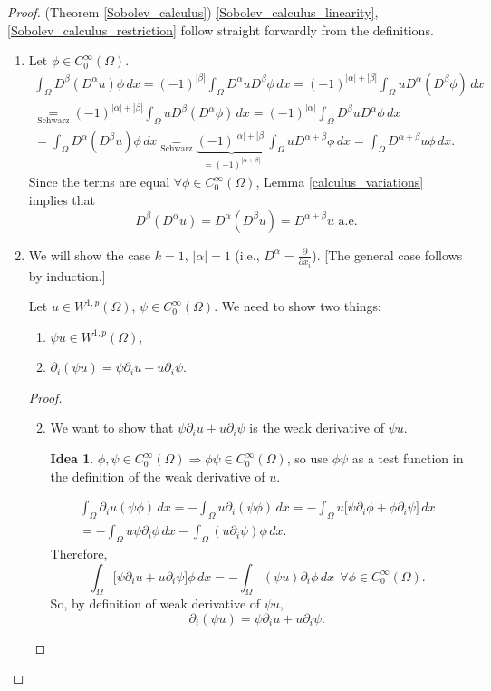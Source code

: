 \documentclass[12pt]{article}
\theoremstyle{definition}
\newtheorem*{idea}{Idea}
\begin{document}
\begin{proof}
(Theorem \ref{Sobolev_calculus}) \ref{Sobolev_calculus_linearity}, \ref{Sobolev_calculus_restriction} follow straight forwardly from the definitions.
\begin{enumerate}[label=(\roman*)]
\item Let $\phi\in C_0^\infty(\Omega)$.
\begin{multline*}
\int_\Omega D^\beta(D^\alpha u)\phi\,dx=(-1)^{|\beta|}\int_\Omega D^\alpha uD^\beta\phi\,dx=(-1)^{|\alpha|+|\beta|}\int_\Omega uD^\alpha(D^\beta\phi)\,dx\\
\underset{\text{Schwarz}}=(-1)^{|\alpha|+|\beta|}\int_\Omega uD^\beta(D^\alpha\phi)\,dx=(-1)^{|\alpha|}\int_\Omega D^\beta uD^\alpha\phi\,dx\\
=\int_\Omega D^\alpha(D^\beta u)\phi\,dx\underset{\text{Schwarz}}=\underbrace{(-1)^{|\alpha|+|\beta|}}_{=(-1)^{|\alpha+\beta|}}\int_\Omega uD^{\alpha+\beta}\phi\,dx=\int_\Omega D^{\alpha+\beta}u\phi\,dx.
\end{multline*}
Since the terms are equal $\forall\phi\in C_0^\infty(\Omega)$, Lemma \ref{calculus_variations} implies that
\[D^\beta(D^\alpha u)=D^\alpha(D^\beta u)=D^{\alpha+\beta}u\text{ a.e.}\]

\item We will show the case $k=1$, $|\alpha|=1$ (i.e., $D^\alpha=\frac\partial{\partial x_i}$). [The general case follows by induction.]

Let $u\in W^{1,p}(\Omega)$, $\psi\in C_0^\infty(\Omega)$. We need to show two things:
\begin{enumerate}[label=(\alph*)]
\item $\psi u\in W^{1,p}(\Omega)$,
\item $\partial_i(\psi u)=\psi\partial_iu+u\partial_i\psi$.
\end{enumerate}
\begin{proof}
\begin{enumerate}[label=(\alph*)]
\setcounter{enumii}{1}
\item We want to show that $\psi\partial_iu+u\partial_i\psi$ is the weak derivative of $\psi u$.

\begin{idea}
$\phi,\psi\in C_0^\infty(\Omega)\Rightarrow\phi\psi\in C_0^\infty(\Omega)$, so use $\phi\psi$ as a test function in the definition of the weak derivative of $u$.
\end{idea}

\begin{multline*}
\int_\Omega\partial_iu(\psi\phi)\,dx=-\int_\Omega u\partial_i(\psi\phi)\,dx=-\int_\Omega u\big[\psi\partial_i\phi+\phi\partial_i\psi\big]\,dx\\
=-\int_\Omega u\psi\partial_i\phi\,dx-\int_\Omega(u\partial_i\psi)\phi\,dx.
\end{multline*}
Therefore,
\[\int_\Omega\big[\psi\partial_iu+u\partial_i\psi\big]\phi\,dx=-\int_\Omega(\psi u)\partial_i\phi\,dx\ \ \forall\phi\in C_0^\infty(\Omega).\]
So, by definition of weak derivative of $\psi u$,
\begin{equation}\tag{$*$}\label{product_rule}
\partial_i(\psi u)=\psi\partial_iu+u\partial_i\psi.
\end{equation}


\end{enumerate}
\end{proof}
\end{enumerate}
\end{proof}
\end{document}
